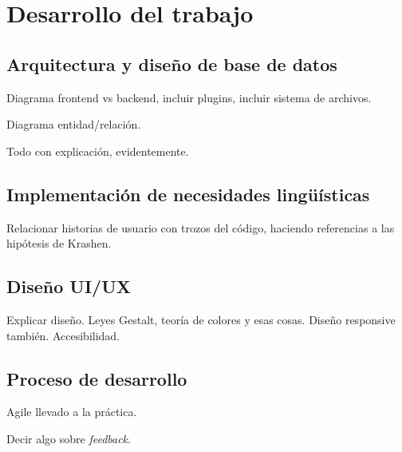 \chapter{Desarrollo del trabajo}  

\section{Arquitectura y diseño de base de datos}

Diagrama frontend vs backend, incluir plugins, incluir sistema de archivos.

Diagrama entidad/relación.

Todo con explicación, evidentemente.
	
\section{Implementación de necesidades lingüísticas}

Relacionar historias de usuario con trozos del código, haciendo referencias a las hipótesis de Krashen.

\section{Diseño UI/UX}

Explicar diseño. Leyes Gestalt, teoría de colores y esas cosas. Diseño responsive también. Accesibilidad.

\section{Proceso de desarrollo}

Agile llevado a la práctica.

Decir algo sobre \textit{feedback}.
